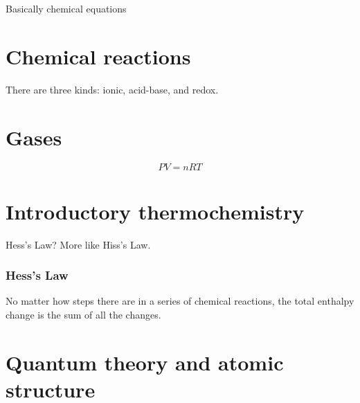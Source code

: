 \documentclass[letterpaper, 12pt]{article}
\begin{document}
Basically chemical equations

\clearpage

\part{Chemical reactions}
There are three kinds: ionic, acid-base, and redox.

\clearpage

\part{Gases}

$$PV = nRT$$

\clearpage

\part{Introductory thermochemistry}

Hess's Law? More like Hiss's Law.

\section{Hess's Law}

No matter how steps there are in a series of chemical reactions, the total enthalpy change is the sum of all the changes.

\clearpage
	
\part{Quantum theory and atomic structure}
\end{document}
